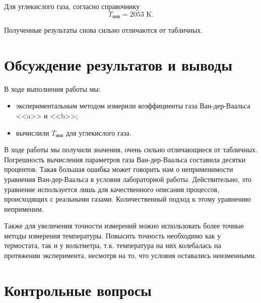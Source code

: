 \documentclass[a4paper,12pt]{article} %
\begin{document}
Для углекислого газа, согласно справочнику  \[ T_\text{инв} = 2053 \text{ K}.\]

Полученные результаты снова сильно отличаются от табличных.

\section{Обсуждение результатов и выводы}

В ходе выполнения работы мы:

\begin{itemize}
	\item экспериментальным методом измерили коэффициенты газа Ван-дер-Ваальса <<a>> и <<b>>;
	\item вычислили $ T_\text{инв} $ для углекислого газа.
\end{itemize}

В ходе работы мы получили значения, очень сильно отличающиеся от табличных. Погрешность вычисления параметров газа Ван-дер-Ваальса составила десятки процентов. Такая большая ошибка может говорить нам о неприменимости уравнения Ван-дер-Ваальса в условия лабораторной работы. Действительно, это уравнение используется лишь для качественного описания процессов, происходящих с реальными газами. Количественный подход к этому уравнению неприменим.

Также для увеличения точности измерений можно использовать более точные методы измерения температуры. Повысить точность необходимо как у термостата, так и у вольтметра, т.к. температура на них колебалась на протяжении эксперимента, несмотря на то, что условия оставались неизменными.

\section{Контрольные вопросы}
\end{document}
